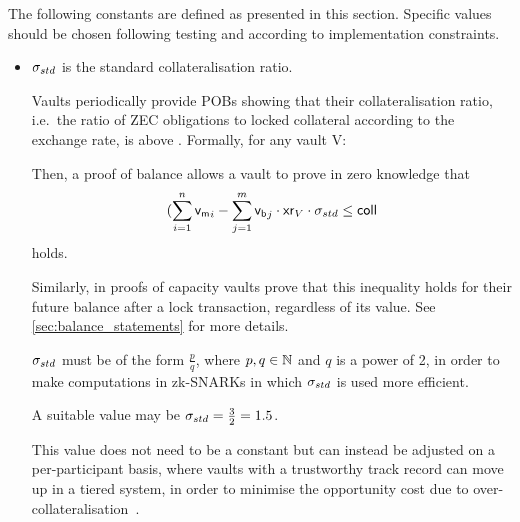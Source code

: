 The following constants are defined as presented in this section.
Specific values should be chosen following testing and according to implementation constraints.

\begin{itemize}
    \item $\sigma_{std}$ is the standard collateralisation ratio.
    
    Vaults periodically provide POBs showing that their collateralisation ratio, i.e.\ the ratio of ZEC obligations to locked collateral according to the exchange rate, is above \sstd.
    Formally, for any vault V:

    Then, a proof of balance allows a vault to prove in zero knowledge that
    \begin{equation}\label{eq:coll_pob}
        (\sum_{i=1}^{n} {\mathsf{v}_{\mathsf{m}}}_i - \sum_{j=1}^{m} {\mathsf{v}_{\mathsf{b}}}_j \cdot \mathsf{xr}_V \cdot \sigma_{std} \leq \mathsf{coll}
    \end{equation}
    holds.

    Similarly, in proofs of capacity vaults prove that this inequality holds for their future balance after a lock transaction, regardless of its value.
    See \cref{sec:balance_statements} for more details.
    
    $\sigma_{std}$ must be of the form $\frac{p}{q}$, where $p, q \in \mathbb{N}$ and $q$ is a power of 2, in order to make computations in zk-SNARKs in which $\sigma_{std}$ is used more efficient.
    
    A suitable value may be $\sigma_{std} = \frac{3}{2} = 1.5$.
    
    This value does not need to be a constant but can instead be adjusted on a per-participant basis, where vaults with a trustworthy track record can move up in a tiered system, in order to minimise the opportunity cost due to over-collateralisation~\cite{harz2019balance}.
    

\end{itemize}
